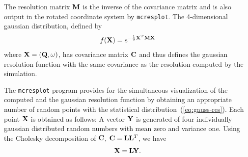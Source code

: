 The resolution matrix ${\bf M}$ is the inverse of the covariance matrix
and is also output in the rotated coordinate system by \verb+mcresplot+.
The 4-dimensional gaussian distribution, defined by
\begin{equation}
  \label{eq:gauss-res}
  f({\bf X}) = e^{-\frac{1}{2}{\bf X}^T {\bf M} {\bf X}}
\end{equation}
where ${\bf X} = ({\bf Q},\omega)$, has covariance matrix ${\bf C}$ and
thus defines the gaussian resolution function with the same covariance
as the resolution computed by the simulation.

The \verb+mcresplot+ program provides for the simultaneous visualization
of the computed and the gaussian resolution function by obtaining an
appropriate number of random points with the statistical
distribution~(\ref{eq:gauss-res}). Each point ${\bf X}$ is obtained as
follows: A vector ${\bf Y}$ is generated of four individually gaussian
distributed random numbers with mean zero and variance one. Using the
Cholesky decomposition of ${\bf C}$, ${\bf C} = {\bf L}{\bf L}^T$, we
have
$$ {\bf X} = {\bf L} {\bf Y}.$$



